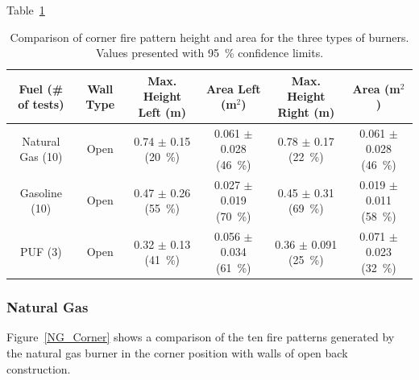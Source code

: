 \documentclass[twoside]{uocthesis}
\begin{document}
Table~\ref{tab:Fire_Pattern_Dimensions_Corners}

\begin{table}
	\centering
	\begin{tabular}{|c|c|c|c|c|c|}
	\hline
	Fuel (\# of tests)      &   Wall Type   & Max. Height Left (m)	 	& Area Left (m$^2$)				&  Max. Height Right (m)        & Area (m$^2$)  				\\ \hline \hline
		Natural Gas (10)    &   Open 		& 0.74 	$\pm$ 0.15 (20~\%)  & 0.061 $\pm$ 0.028 (46~\%) 	&  0.78 $\pm$ 0.17 (22~\%) 	 	& 0.061 $\pm$ 0.028 (46~\%)  	\\
		Gasoline (10)       &   Open    	& 0.47	$\pm$ 0.26 (55~\%)  & 0.027 $\pm$ 0.019 (70~\%) 	&  0.45 $\pm$ 0.31 (69~\%)  	& 0.019 $\pm$ 0.011 (58~\%)\\
		PUF (3)       		&   Open 		& 0.32	$\pm$ 0.13 (41~\%)  & 0.056 $\pm$ 0.034 (61~\%) 	&  0.36 $\pm$ 0.091 (25~\%)  	& 0.071 $\pm$ 0.023 (32~\%)\\
	\hline
	\end{tabular}
	\caption[Comparison of corner fire pattern height and area for the three types of burners]{Comparison of corner fire pattern height and area for the three types of burners. Values presented with 95~\% confidence limits.}
	\label{tab:Fire_Pattern_Dimensions_Corners}
\end{table}

\subsubsection{Natural Gas}

Figure~\ref{NG_Corner} shows a comparison of the ten fire patterns generated by the natural gas burner in the corner position with walls of open back construction. 
\end{document}
